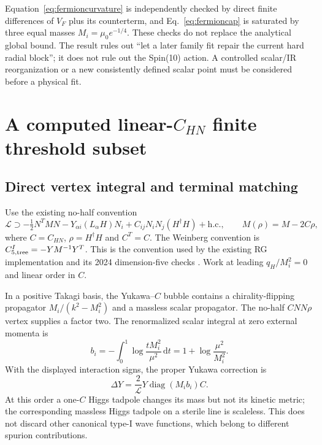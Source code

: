 \documentclass[11pt]{article}
\newcommand{\diag}{\operatorname{diag}}
\newcommand{\dd}{\mathrm d}
\newcommand{\LOOP}{\mathcal L}
\begin{document}
Equation~\eqref{eq:fermioncurvature} is independently checked by direct
finite differences of $V_F$ plus its counterterm, and
Eq.~\eqref{eq:fermioncap} is saturated by three equal masses
$M_i=\mu_0e^{-1/4}$. These checks do not replace the analytical global
bound. The result rules out ``let a later family fit repair the current
hard radial block''; it does not rule out the Spin(10) action. A
controlled scalar/IR reorganization or a new consistently defined scalar
point must be considered before a physical fit.

\section{A computed linear-\texorpdfstring{$C_{HN}$}{CHN} finite threshold subset}
\subsection{Direct vertex integral and terminal matching}
Use the existing no-half convention
\begin{equation}
 \mathcal L\supset-\tfrac12N^TMN-Y_{\alpha i}(L_\alpha H)N_i
                  +C_{ij}N_iN_j(H^\dagger H)+\mathrm{h.c.},
 \qquad M(\rho)=M-2C\rho,
\end{equation}
where $C=C_{HN}$, $\rho=H^\dagger H$ and $C^T=C$. The Weinberg convention
is $C_{5,\rm tree}^{I}=-YM^{-1}Y^T$. This is the convention used by the
existing RG implementation and its 2024 dimension-five checks
\cite{zhang2024}. Work at leading $q_H/M_i^2=0$ and linear order in $C$.

In a positive Takagi basis, the Yukawa--$C$ bubble contains a
chirality-flipping propagator $M_i/(k^2-M_i^2)$ and a massless scalar
propagator. The no-half $C NN\rho$ vertex supplies a factor two. The
renormalized scalar integral at zero external momenta is
\begin{equation}
 b_i=-\int_0^1\log\frac{tM_i^2}{\mu^2}\,\dd t
       =1+\log\frac{\mu^2}{M_i^2}.
\end{equation}
With the displayed interaction signs, the proper Yukawa correction is
\begin{equation}
 \Delta Y=\frac2{\LOOP}Y\diag(M_i b_i)C.
 \label{eq:CHNY}
\end{equation}
At this order a one-$C$ Higgs tadpole changes its mass but not its
kinetic metric; the corresponding massless Higgs tadpole on a sterile
line is scaleless. This does not discard other canonical type-I wave
functions, which belong to different spurion contributions.
\end{document}
